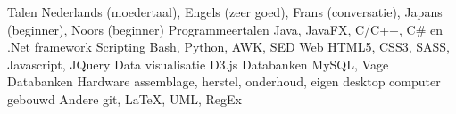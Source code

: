 \begin{cvskills}
  \cvskill
    {Talen}
    {Nederlands (moedertaal), Engels (zeer goed), Frans (conversatie), Japans (beginner), Noors (beginner) }
  \cvskill
    {Programmeertalen}
    {Java, JavaFX, C/C++, C\# en .Net framework}
  \cvskill
    {Scripting}
    {Bash, Python, AWK, SED}
  \cvskill
    {Web}
    {HTML5, CSS3, SASS, Javascript, JQuery}
  \cvskill
    {Data visualisatie}
    {D3.js}
  \cvskill
    {Databanken}
    {MySQL, Vage Databanken}
  \cvskill
    {Hardware}
    {assemblage, herstel, onderhoud, eigen desktop computer gebouwd}
  \cvskill
    {Andere}
    {git, \LaTeX, UML, RegEx}
\end{cvskills}

